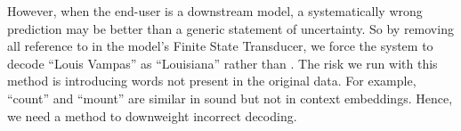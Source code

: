 However, when the end-user is a downstream model,
a systematically wrong prediction may be better than a generic
statement of uncertainty.  So by removing all reference to \unk{} in
the model's Finite State Transducer, we force the system to decode
``Louis Vampas'' as ``Louisiana'' rather than \unk{}.  The risk we run
with this method is introducing words not present in the original
data.  For example, ``count'' and ``mount'' are similar in sound but
not in context embeddings.  Hence, we need a method to downweight
incorrect decoding.

\begin{comment}
One way to address our problem is to enhance the \textsc{asr} data
predictions based on the downstream task: in our case, potential answers to
a question.  Hearing "Dumas" should receive heavy weighting if the
answer is "Count of Monte Cristo", but be down-weighted if the answer
is ``Centripetal Force''.  We create a more accurate posterior
probability by introducing the prior distribution of words for a given
answer.

From a noisy-channel perspective, we attempt to
recover the true word, before it became corrupted by the \textsc{asr}
system.  The original text $t$ is the start of our generative process.  This
text is transposed into sound $s$.  However, the sound is corrupted
during decoding and becomes recognized text $r$ rather than the
original text.  The equation that solves this problem is:
\begin{align}[t]
\argmax_a\explain{prediction}{p(a \g r_{ia_r})}  * \prod_i^N \sum_j^V
&\explain{\textsc{asr}}{p(r_i \g s)} *  \\
 &\explain{domain}{p(t_j \g a, c)} *\\
 &\explain{\textsc{asr} biases}{(r_i \g t_j)}
 \end{align}
where $a$ is the answer, $r$ is the recognized text, $s$ is the
original sound wave, and $t$ is the true text.




This equation weighs the prediction of a model based on a concoction
of the \textsc{asr} system output, the likeliness of a word given an
particular answer and category combination, and the systemic issues in
the \textsc{asr} system. By default, the \textsc{asr} system makes a
prediction without any domain knowledge.  But, certain interpretations
of words are far more likely than others given a particular context.
A low-likelhood word---``Tut''--- should be considered more heavily
than high-probability alternatives---``hut''--- if the potential
downstream answer is"Egypt" or a category is
"History"; \begin{math}{p(t_j \g a, c)}\end{math} adds this knowledge.
Additionally, we want to address situations where words are not seen
in the \textsc{asr} training data and are systematically
miscategorized, such as the hyptothetical ``Tut''
example; \begin{math}p(r_i \g t_j)\end{math} does exactly this.


\end{comment}
